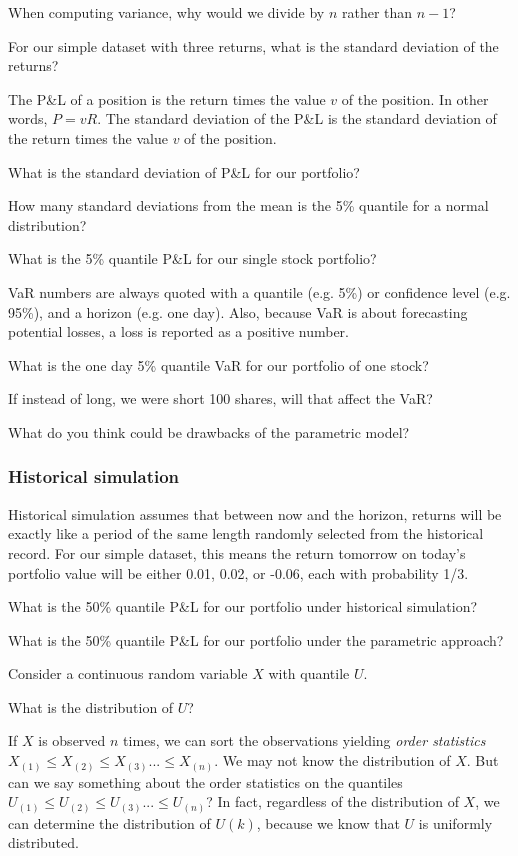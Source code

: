 \documentclass{report}
\numberwithin{problem}{chapter} %
\let\oldroblem\problem
\renewcommand{\problem}{ \oldroblem  \normalfont}
\newcommand{\vs}{\vspace}
\newcommand{\pnl}{P\&L }
\begin{document}
\problem When computing variance, why would we divide by $n$ rather than $n-1$?

\problem For our simple dataset with three returns, what is the standard deviation of the returns?

\vs{.5cm}

The \pnl of a \gls{position} is the return times the value $v$ of the position. In other words, $P = v R$. The standard deviation of the \pnl is the standard deviation of the return times the value $v$ of the position.

\problem What is the standard deviation of \pnl for our portfolio?

\problem How many standard deviations from the mean is the 5\% quantile for a normal distribution?

\problem What is the 5\% quantile \pnl for our single stock portfolio?

\gls{VaR} numbers are always quoted with a quantile (e.g. 5\%)  or confidence level (e.g. 95\%), and a horizon (e.g. one day). Also, because VaR is about forecasting potential losses, a loss is reported as a positive number. 

\problem What is the one day 5\% quantile VaR for our portfolio of one stock?

\problem If instead of long, we were short 100 shares, will that affect the VaR?

\problem What do you think could be drawbacks of the parametric model?

\subsubsection{Historical simulation}
Historical simulation assumes that between now and the horizon, returns will be exactly like a period of the same length randomly selected from the historical record. For our simple dataset, this means the return tomorrow on today's portfolio value will be either 0.01, 0.02, or -0.06, each with probability 1/3.

\problem What is the 50\% quantile \pnl for our portfolio under historical simulation? 

\problem What is the 50\% quantile \pnl for our portfolio under the parametric approach?

\pagebreak Consider a continuous random variable $X$ with quantile $U$. 

\problem What is the distribution of $U$? 
\vs{5mm}

If $X$ is  observed $n$ times, we can sort the observations yielding {\it order statistics} $X_{(1)} \leq X_{(2)} \leq X_{(3)} ...  \leq X_{(n)}$. We may not know the distribution of $X$. But can we say something about the order statistics on the quantiles $U_{(1)} \leq U_{(2)} \leq U_{(3)} ...  \leq U_{(n)}$? In fact, regardless of the distribution of $X$, we can determine the distribution of $U(k)$, because we know that $U$ is uniformly distributed.
\end{document}
